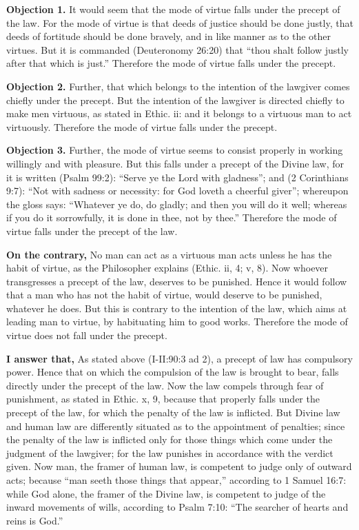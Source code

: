 \textbf{Objection 1.} It would seem that the mode of virtue falls under the precept of the law. For the mode of virtue is that deeds of justice should be done justly, that deeds of fortitude should be done bravely, and in like manner as to the other virtues. But it is commanded (Deuteronomy 26:20) that ``thou shalt follow justly after that which is just.'' Therefore the mode of virtue falls under the precept.

\textbf{Objection 2.} Further, that which belongs to the intention of the lawgiver comes chiefly under the precept. But the intention of the lawgiver is directed chiefly to make men virtuous, as stated in Ethic. ii: and it belongs to a virtuous man to act virtuously. Therefore the mode of virtue falls under the precept.

\textbf{Objection 3.} Further, the mode of virtue seems to consist properly in working willingly and with pleasure. But this falls under a precept of the Divine law, for it is written (Psalm 99:2): ``Serve ye the Lord with gladness''; and (2 Corinthians 9:7): ``Not with sadness or necessity: for God loveth a cheerful giver''; whereupon the gloss says: ``Whatever ye do, do gladly; and then you will do it well; whereas if you do it sorrowfully, it is done in thee, not by thee.'' Therefore the mode of virtue falls under the precept of the law.

\textbf{On the contrary,} No man can act as a virtuous man acts unless he has the habit of virtue, as the Philosopher explains (Ethic. ii, 4; v, 8). Now whoever transgresses a precept of the law, deserves to be punished. Hence it would follow that a man who has not the habit of virtue, would deserve to be punished, whatever he does. But this is contrary to the intention of the law, which aims at leading man to virtue, by habituating him to good works. Therefore the mode of virtue does not fall under the precept.

\textbf{I answer that,} As stated above (I-II:90:3 ad 2), a precept of law has compulsory power. Hence that on which the compulsion of the law is brought to bear, falls directly under the precept of the law. Now the law compels through fear of punishment, as stated in Ethic. x, 9, because that properly falls under the precept of the law, for which the penalty of the law is inflicted. But Divine law and human law are differently situated as to the appointment of penalties; since the penalty of the law is inflicted only for those things which come under the judgment of the lawgiver; for the law punishes in accordance with the verdict given. Now man, the framer of human law, is competent to judge only of outward acts; because ``man seeth those things that appear,'' according to 1 Samuel 16:7: while God alone, the framer of the Divine law, is competent to judge of the inward movements of wills, according to Psalm 7:10: ``The searcher of hearts and reins is God.''

